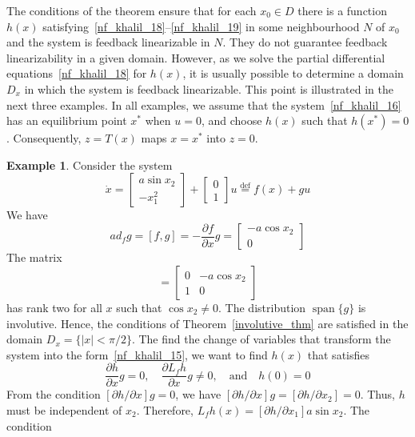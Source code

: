 \documentclass[11pt,a4paper,oneside]{book}
\numberwithin{equation}{section}
\DeclareMathOperator{\spn}{span}
\newcommand{\abs}[1]{\left|#1\right|}
\theoremstyle{it}
\theoremstyle{definition}
\newtheorem{example}{Example}[section]
\begin{document}
The conditions of the theorem ensure that for each $x_0\in D$ there is a function $h(x)$ satisfying~\eqref{nf_khalil_18}--\eqref{nf_khalil_19} in some neighbourhood $N$ of $x_0$ and the system is feedback linearizable in $N$. They do not guarantee feedback linearizability in a given domain. However, as we solve the partial differential equations~\eqref{nf_khalil_18} for $h(x)$, it is usually possible to determine a domain $D_x$ in which the system is feedback linearizable. This point is illustrated in the next three examples. In all examples, we assume that the system~\eqref{nf_khalil_16} has an equilibrium point $x^*$ when $u=0$, and choose $h(x)$ such that $h(x^*)=0$. Consequently, $z=T(x)$ maps $x=x^*$ into $z=0$.
\begin{example}
Consider the system
	\begin{equation*}
		\dot{x}=\begin{bmatrix} a\sin x_2 \\[6pt] -x_1^2 \end{bmatrix} + \begin{bmatrix} 0 \\[6pt] 1 \end{bmatrix}u\stackrel{\text{def}}{=}f(x)+gu
	\end{equation*}
We have
	\begin{equation*}
		ad_fg=[f,g]=-\frac{\partial f}{\partial x}g = \begin{bmatrix} -a\cos x_2 \\[6pt] 0 \end{bmatrix}
	\end{equation*}
The matrix
	\begin{equation*}
		[g,ad_fg]= \begin{bmatrix} 0 &-a\cos x_2 \\[6pt] 1 & 0 \end{bmatrix}
	\end{equation*}	
has rank two for all $x$ such that $\cos x_2\ne0$. The distribution $\spn\{g\}$ is involutive. Hence, the conditions of Theorem~\ref{involutive_thm} are satisfied in the domain $D_x=\{\abs{x}<\pi/2\}$. The find the change of variables that transform the system into the form~\eqref{nf_khalil_15}, we want to find $h(x)$ that satisfies
\begin{equation*}
	\frac{\partial h}{\partial x}g=0,\quad\frac{\partial L_fh}{\partial x}g\ne0,\quad\text{and}\quad h(0)=0
\end{equation*}
From the condition $[\partial h/\partial x]g=0$, we have $[\partial h/\partial x]g=[\partial h/\partial x_2]=0$. Thus, $h$ must be independent of $x_2$. Therefore, $L_fh(x)=[\partial h/\partial x_1]a\sin x_2$. The condition

\end{example}
\end{document}
